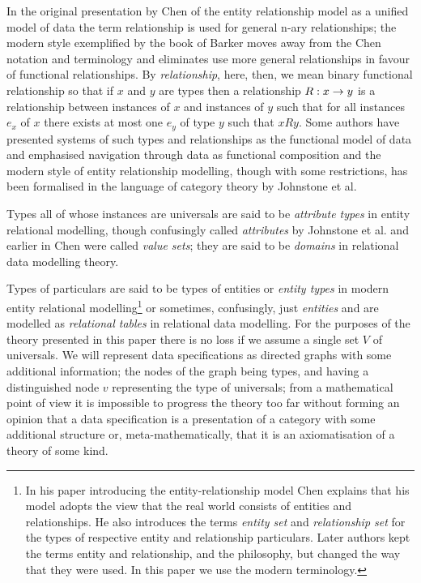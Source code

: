 \documentclass[10pt,a4paper]{article}
\newcommand{\veee}{v}
\newcommand{\Veee}{V}
\begin{document}
In the original presentation by Chen of the
 entity relationship model as a unified model of data the term relationship is used 
for general n-ary relationships;  the modern style exemplified by the book of Barker moves away from the Chen notation and terminology and eliminates use more general 
relationships in favour of functional relationships.
By \textit{relationship}, here, then, we mean binary functional relationship so that if $x$ and $y$ are types then a relationship $R: x \rightarrow y$ is a relationship between
instances of $x$ and instances of $y$ such that for all instances $e_x$ of $x$
there exists at most one $e_y$ of type $y$ such that $x R y$. Some authors have presented  systems of such types and relationships as the functional model of data and emphasised navigation through data as functional composition and the modern style of entity relationship modelling, though with some restrictions, has been formalised in the language of category theory by Johnstone et al. 

Types all of whose instances are universals  are said to be \textit{attribute types} in entity relational 
modelling, though confusingly called \textit{attributes} by Johnstone et al. and earlier
in Chen were called \textit{value sets}; they are said to be \textit{domains} in relational data modelling theory. 

Types of particulars are said to be 
types of entities or \textit{entity types} in modern entity relational modelling\footnote{In  his paper  introducing the entity-relationship model Chen explains that his model adopts the view that the real world consists of entities and relationships. He also introduces the  terms \textit{entity set} and \textit{relationship set} for the types of respective entity and relationship particulars. Later authors kept the terms entity and relationship, and the philosophy, but changed the way that they were used. In this paper we use the modern terminology.} or sometimes, confusingly, just \textit{entities}  and 
are modelled as \textit{relational tables} in relational data modelling. For the purposes of the theory presented in this paper there is no loss if we assume a single set $\Veee$ of universals.  We will represent data specifications as directed graphs with 
some additional information; the nodes of the graph being types, and having a distinguished node $\veee$ representing the type of universals; from a mathematical point of view it is impossible to progress the theory too far without forming an opinion that a data specification is a presentation of a category with some additional structure or, meta-mathematically, that it is an axiomatisation of a theory of some kind. 
\end{document}
